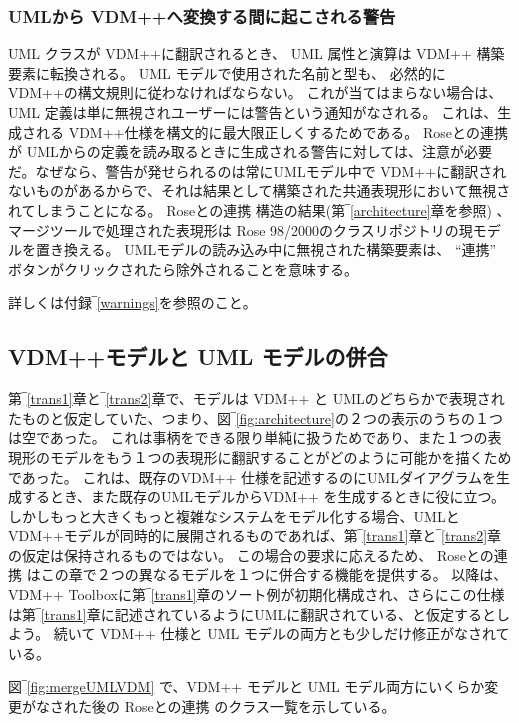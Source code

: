 \documentclass[\pformat,12pt]{jarticle}
\newcommand{\vdmpp}{VDM++}
\newcommand{\link}{Roseとの連携}
\newcommand{\rose}{Rose 98/2000}
\begin{document}
\subsubsection*{UMLから \vdmpp{}へ変換する間に起こされる警告}


UML クラスが \vdmpp{}に翻訳されるとき、 UML 属性と演算は \vdmpp{} 構築要素に転換される。  
 UML モデルで使用された名前と型も、 必然的に\vdmpp{}の構文規則に従わなければならない。
これが当てはまらない場合は、 UML 定義は単に無視されユーザーには警告という通知がなされる。
これは、生成される \vdmpp{}仕様を構文的に最大限正しくするためである。
\link{} が UMLからの定義を読み取るときに生成される警告に対しては、注意が必要だ。なぜなら、警告が発せられるのは常にUMLモデル中で \vdmpp{}に翻訳されないものがあるからで、それは結果として構築された共通表現形において無視されてしまうことになる。 \link{} 構造の結果(第‾\ref{architecture}章を参照) 、マージツールで処理された表現形は \rose{}のクラスリポジトリの現モデルを置き換える。 
UMLモデルの読み込み中に無視された構築要素は、 ``連携'' ボタンがクリックされたら除外されることを意味する。

詳しくは付録‾\ref{warnings}を参照のこと。

\subsection{VDM++モデルと UML モデルの併合} \label{merging}


第‾\ref{trans1}章と‾\ref{trans2}章で、モデルは \vdmpp{} と UMLのどちらかで表現されたものと仮定していた、つまり、図‾\ref{fig:architecture}の２つの表示のうちの１つは空であった。
これは事柄をできる限り単純に扱うためであり、また１つの表現形のモデルをもう１つの表現形に翻訳することがどのように可能かを描くためであった。
これは、既存の\vdmpp{} 仕様を記述するのにUMLダイアグラムを生成するとき、また既存のUMLモデルから\vdmpp{} を生成するときに役に立つ。
しかしもっと大きくもっと複雑なシステムをモデル化する場合、UMLと \vdmpp{}モデルが同時的に展開されるものであれば、第‾\ref{trans1}章と‾\ref{trans2}章の仮定は保持されるものではない。
この場合の要求に応えるため、 \link{} はこの章で２つの異なるモデルを１つに併合する機能を提供する。
以降は、\vdmpp{} Toolboxに第‾\ref{trans1}章のソート例が初期化構成され、さらにこの仕様は第‾\ref{trans1}章に記述されているようにUMLに翻訳されている、と仮定するとしよう。
続いて \vdmpp{} 仕様と UML モデルの両方とも少しだけ修正がなされている。

図‾\ref{fig:mergeUMLVDM} で、\vdmpp{} モデルと UML モデル両方にいくらか変更がなされた後の \link{} のクラス一覧を示している。
\end{document}
